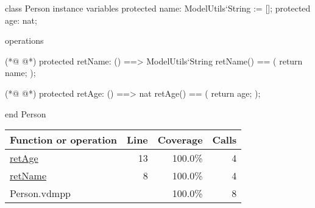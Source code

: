 \begin{vdmpp}[breaklines=true]
class Person
instance variables
  protected name: ModelUtils`String := [];
  protected age: nat;
  
operations

(*@
\label{retName:8}
@*)
  protected retName: () ==> ModelUtils`String
  retName() == (
    return name;  
  );
 
(*@
\label{retAge:13}
@*)
  protected retAge: () ==> nat
  retAge() == (
    return age;  
  );
  

end Person
\end{vdmpp}
\bigskip
\begin{longtable}{|l|r|r|r|}
\hline
Function or operation & Line & Coverage & Calls \\
\hline
\hline
\hyperref[retAge:13]{retAge} & 13&100.0\% & 4 \\
\hline
\hyperref[retName:8]{retName} & 8&100.0\% & 4 \\
\hline
\hline
Person.vdmpp & & 100.0\% & 8 \\
\hline
\end{longtable}

